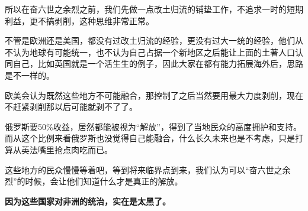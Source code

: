 \documentclass[UTF8, 11pt, oneside]{ctexart}
\newcommand{\zd}[1]{\textbf{\textcolor[RGB]{123,12,0}{#1}}} %
\begin{document}
所以在奋六世之余烈之前，我们先做一点改土归流的铺垫工作，不追求一时的短期利益，更不搞剥削，这种思维非常正常。

不管是欧洲还是美国，都没有过改土归流的经验，更没有过大一统的经验，他们从不认为地球有可能统一，也不认为自己占据一个新地区之后能让上面的土著人口认同自己，比如英国就是一个活生生的例子，因此大家在都有能力拓展海外后，思路是不一样的。

欧美会认为既然这些地方不可能融合，那控制了之后当然要用最大力度剥削，现在不赶紧剥削那以后可能就剥不了了。

俄罗斯要50\%收益，居然都能被视为“解放”，得到了当地民众的高度拥护和支持。而从这个比例来看俄罗斯也没觉得自己能融合，什么长久未来也是不考虑，只是打算从英法嘴里抢点肉吃而已。

这些地方的民众慢慢等着吧，等到将来临界点到来，我们认为可以“奋六世之余烈”的时候，会让他们知道什么才是真正的解放。

\zd{因为这些国家对非洲的统治，实在是太黑了。}
\end{document}
